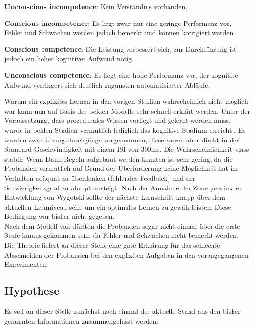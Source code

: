 \documentclass[doc,a4paper,12pt]{apa6}
\begin{document}
\begin{compactenum}
  \item \textbf{Unconscious incompetence}: Kein Verständnis vorhanden.
  \item \textbf{Conscious incompetence}: Es liegt zwar nur eine geringe Performanz vor, Fehler und Schwächen werden jedoch bemerkt und können korrigiert werden.
  \item \textbf{Conscious competence}: Die Leistung verbessert sich, zur Durchführung ist jedoch ein hoher kognitiver Aufwand nötig.
  \item \textbf{Unconscious competence}: Es liegt eine hohe Performanz vor, der kognitive Aufwand verringert sich deutlich zugunsten automatisierter Abläufe.
\end{compactenum}

Warum ein explizites Lernen in den vorigen Studien wahrscheinlich nicht möglich war kann nun auf Basis der beiden Modelle sehr schnell erklärt werden. Unter der Voraussetzung, dass prozedurales Wissen vorliegt und gelernt werden muss, wurde in beiden Studien vermutlich lediglich das kognitive Stadium erreicht \parencite[nach][]{fitts1967human}. Es wurden zwar Übungsdurchgänge vorgenommen, diese waren aber direkt in der Standard-Geschwindigkeit mit einem ISI von 300ms. Die Wahrscheinlichkeit, dass stabile Wenn-Dann-Regeln aufgebaut werden konnten ist sehr gering, da die Probanden vermutlich auf Grund der Überforderung keine Möglichkeit hat ihr Verhalten adäquat zu überdenken (fehlendes Feedback) und der Schwierigkeitsgrad zu abrupt ansteigt. Nach der Annahme der Zone proximaler Entwicklung von Wygotski \parencite{kozulin2003vygotsky} sollte der nächste Lernschritt knapp über dem aktuellen Lernniveau sein, um ein optimales Lernen zu gewährleisten. Diese Bedingung war bisher nicht gegeben.\\
Nach dem Modell von \textcite{whitmore2009coaching} dürften die Probanden sogar nicht einmal über die erste Stufe hinaus gekommen sein, da Fehler und Schwächen nicht bemerkt werden. Die Theorie liefert an dieser Stelle eine gute Erklärung für das schlechte Abschneiden der Probanden bei den expliziten Aufgaben in den vorangegangenen Experimenten.

\subsection{Hypothese}

Es soll an dieser Stelle zunächst noch einmal der aktuelle Stand aus den bisher genannten Informationen zusammengefasst werden:
\end{document}
